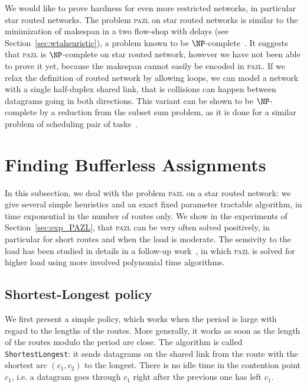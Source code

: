 \documentclass[a4paper,10pt]{article}
\newcommand\shortestlongest{\texttt{ShortestLongest}\xspace}
\newcommand\pazl{\textsc{pazl}\xspace}
\begin{document}
	We would like to prove hardness for even more restricted networks, in particular star routed networks.
   The problem \pazl on star routed networks is similar to the minimization of makespan in a two flow-shop with delays (see Section~\ref{sec:wtaheuristic}), a problem known to be $\NP$-complete~\cite{yu2004minimizing}. It suggests that \pazl is $\NP$-complete on star routed network, however we have not been able to prove it yet,  because the makespan cannot easily be encoded in \pazl. If we relax the definition of routed network by allowing loops,  we can model a network with a single half-duplex shared link, that is collisions can happen between datagrams going in both directions. This variant can be shown to be $\NP$-complete by a reduction from the subset sum problem, as it is done for a similar problem of scheduling pair of tasks~\cite{orman1997complexity}.
  

\section{Finding Bufferless Assignments} \label{sec:PAZL}
  
  In this subsection, we deal with the problem \pazl on a star routed network: 
  we give several simple heuristics and an exact fixed parameter tractable algorithm, in time exponential in the number of routes only. We show in the experiments of Section~\ref{sec:exp_PAZL}, that \pazl can be very often solved positively, in particular for short routes and when the load is moderate. The sensivity to the load has been studied in details in a follow-up work~\cite{guiraud2020scheduling}, in which \pazl is solved for higher load using more involved polynomial time algorithms. 
  
	\subsection{Shortest-Longest policy}
    

    We first present a simple policy, which works when the period is large with regard to the lengths of the routes. More generally, it works as soon as the length of the routes modulo the period are close. The algorithm is called \shortestlongest: it sends datagrams on the shared link from the route with the shortest arc $(c_1,c_2)$ to the longest. There is no idle time in the contention point $c_1$, i.e. a datagram goes through $c_1$ right after the previous one has left $c_1$.
      
\end{document}

